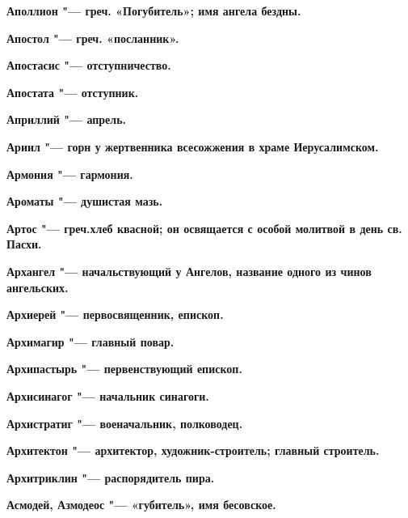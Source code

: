 \begin{mymulticols}{2}
\bfseries Аполлион\normalfont{} "--- греч. «Погубитель»; имя ангела бездны. 




\bfseries Апостол\normalfont{} "--- греч. «посланник». 




\bfseries Апостасис\normalfont{} "--- отступничество. 




\bfseries Апостата\normalfont{} "--- отступник. 




\bfseries Априллий\normalfont{} "--- апрель. 




\bfseries Ариил\normalfont{} "--- горн у жертвенника всесожжения в храме Иерусалимском. 




\bfseries Армония\normalfont{} "--- гармония. 




\bfseries Ароматы\normalfont{} "--- душистая мазь. 




\bfseries Артос\normalfont{} "--- греч.хлеб квасной; он освящается с особой молитвой в день св. Пасхи. 




\bfseries Архангел\normalfont{} "--- начальствующий у Ангелов, название одного из чинов ангельских. 




\bfseries Архиерей\normalfont{} "--- первосвященник, епископ. 




\bfseries Архимагир\normalfont{} "--- главный повар. 




\bfseries Архипастырь\normalfont{} "--- первенствующий епископ. 




\bfseries Архисинагог\normalfont{} "--- начальник синагоги. 




\bfseries Архистратиг\normalfont{} "--- военачальник, полководец. 




\bfseries Архитектон\normalfont{} "--- архитектор, художник-строитель; главный строитель. 




\bfseries Архитриклин\normalfont{} "--- распорядитель пира. 




\bfseries Асмодей, Азмодеос\normalfont{} "--- «губитель», имя бесовское. 





\end{mymulticols}
